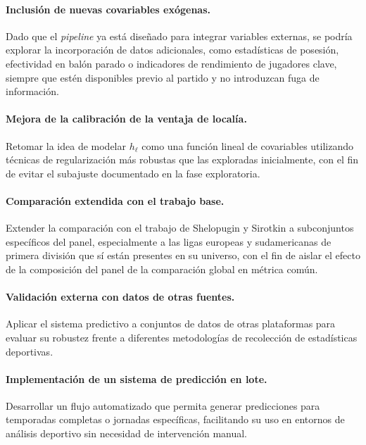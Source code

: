 \paragraph{Inclusi\'on de nuevas covariables ex\'ogenas.} Dado que el \textit{pipeline} ya est\'a dise\~nado para integrar variables externas, se podr\'ia explorar la incorporaci\'on de datos adicionales, como estad\'isticas de posesi\'on, efectividad en bal\'on parado o indicadores de rendimiento de jugadores clave, siempre que est\'en disponibles previo al partido y no introduzcan fuga de informaci\'on.

\paragraph{Mejora de la calibraci\'on de la ventaja de local\'ia.} Retomar la idea de modelar $h_\ell$ como una funci\'on lineal de covariables utilizando t\'ecnicas de regularizaci\'on m\'as robustas que las exploradas inicialmente, con el fin de evitar el subajuste documentado en la fase exploratoria.

\paragraph{Comparaci\'on extendida con el trabajo base.} Extender la comparaci\'on con el trabajo de Shelopugin y Sirotkin a subconjuntos espec\'ificos del panel, especialmente a las ligas europeas y sudamericanas de primera divisi\'on que s\'i est\'an presentes en su universo, con el fin de aislar el efecto de la composici\'on del panel de la comparaci\'on global en m\'etrica com\'un.

\paragraph{Validaci\'on externa con datos de otras fuentes.} Aplicar el sistema predictivo a conjuntos de datos de otras plataformas para evaluar su robustez frente a diferentes metodolog\'ias de recolecci\'on de estad\'isticas deportivas.

\paragraph{Implementaci\'on de un sistema de predicci\'on en lote.} Desarrollar un flujo automatizado que permita generar predicciones para temporadas completas o jornadas espec\'ificas, facilitando su uso en entornos de an\'alisis deportivo sin necesidad de intervenci\'on manual.

